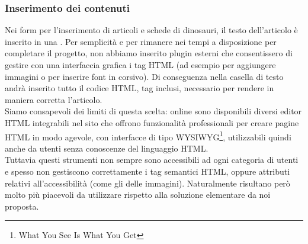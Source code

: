 \documentclass[12pt]{article}
\begin{document}
	\subsubsection{Inserimento dei contenuti} \label{sssec:inserimentocontenuti}
	Nei form per l'inserimento di articoli e schede di dinosauri, il testo dell'articolo è inserito in una . Per semplicità e per rimanere nei tempi a disposizione per completare il progetto, non abbiamo inserito plugin esterni che consentissero di gestire con una interfaccia grafica i tag HTML (ad esempio per aggiungere immagini o per inserire font in corsivo). Di conseguenza nella casella di testo andrà inserito tutto il codice HTML, tag inclusi, necessario per rendere in maniera corretta l'articolo. \\
	Siamo consapevoli dei limiti di questa scelta: online sono disponibili diversi editor HTML integrabili nel sito che offrono funzionalità professionali per creare pagine HTML in modo agevole, con interfacce di tipo WYSIWYG\footnote{What You See Is What You Get}, utilizzabili quindi anche da utenti senza conoscenze del linguaggio HTML.\\
	Tuttavia questi strumenti non sempre sono accessibili ad ogni categoria di utenti e spesso non gestiscono correttamente i tag semantici HTML, oppure attributi relativi all'accessibilità (come gli  delle immagini). Naturalmente risultano però molto più piacevoli da utilizzare rispetto alla soluzione elementare da noi proposta.
	
\end{document}
